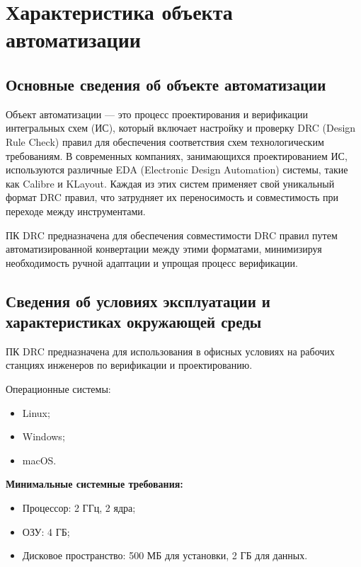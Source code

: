 \section{Характеристика объекта автоматизации}

\subsection{Основные сведения об объекте автоматизации}

Объект автоматизации --- это процесс проектирования
и верификации интегральных схем (ИС),
который включает настройку и проверку DRC (Design Rule Check) правил
для обеспечения соответствия схем технологическим требованиям.
В современных компаниях, занимающихся проектированием ИС,
используются различные EDA (Electronic Design Automation) системы,
такие как Calibre и KLayout.
Каждая из этих систем применяет свой уникальный формат DRC правил,
что затрудняет их переносимость
и совместимость при переходе между инструментами.

ПК DRC предназначена для обеспечения совместимости DRC
правил путем автоматизированной конвертации между этими форматами,
минимизируя необходимость ручной адаптации и упрощая процесс верификации. 

\subsection{Сведения об условиях эксплуатации
	и характеристиках окружающей среды}

ПК DRC предназначена для использования в офисных условиях
на рабочих станциях инженеров по верификации и проектированию.

Операционные системы:

\begin{itemize}
	\item Linux;
	\item Windows;
	\item macOS.
\end{itemize}

\textbf{Минимальные системные требования:}

\begin{itemize}
	\item Процессор: 2 ГГц, 2 ядра;
	\item ОЗУ: 4 ГБ;
	\item Дисковое пространство: 500 МБ для установки, 2 ГБ для данных.
\end{itemize}

